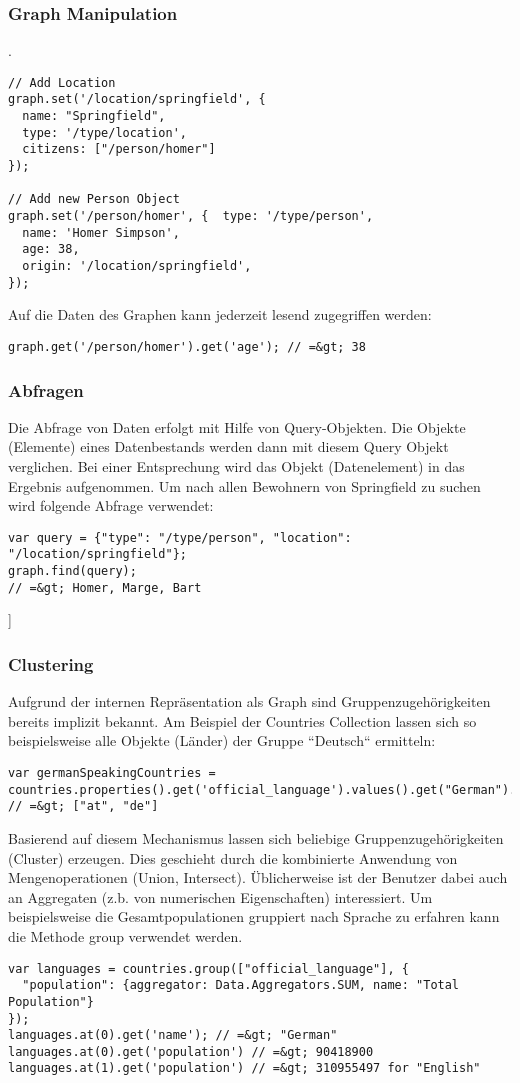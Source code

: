 \documentclass[runningheads]{llncs}
\begin{document}
\subsubsection{Graph Manipulation}
.\begin{verbatim}
// Add Location
graph.set('/location/springfield', {
  name: "Springfield",
  type: '/type/location',
  citizens: ["/person/homer"]
});

// Add new Person Object
graph.set('/person/homer', {  type: '/type/person',
  name: 'Homer Simpson',
  age: 38,
  origin: '/location/springfield',
});
\end{verbatim}


Auf die Daten des Graphen kann jederzeit lesend zugegriffen werden:\begin{verbatim}
graph.get('/person/homer').get('age'); // =&gt; 38
\end{verbatim}


\subsubsection{Abfragen}


Die Abfrage von Daten erfolgt mit Hilfe von Query-Objekten. Die Objekte (Elemente) eines Datenbestands werden dann mit diesem Query Objekt verglichen. Bei einer Entsprechung wird das Objekt (Datenelement) in das Ergebnis aufgenommen. Um nach allen Bewohnern von Springfield zu suchen wird folgende Abfrage verwendet:\begin{verbatim}
var query = {"type": "/type/person", "location": "/location/springfield"};
graph.find(query);
// =&gt; Homer, Marge, Bart
\end{verbatim}
]

\subsubsection{Clustering}


Aufgrund der internen Repräsentation als Graph sind Gruppenzugehörigkeiten bereits implizit bekannt. Am Beispiel der Countries Collection lassen sich so beispielsweise alle Objekte (Länder) der Gruppe ``Deutsch`` ermitteln:\begin{verbatim}
var germanSpeakingCountries = countries.properties().get('official_language').values().get("German").objects();
// =&gt; ["at", "de"]
\end{verbatim}


Basierend auf diesem Mechanismus lassen sich beliebige Gruppenzugehörigkeiten (Cluster) erzeugen. Dies geschieht durch die kombinierte Anwendung von Mengenoperationen (Union, Intersect). Üblicherweise ist der Benutzer dabei auch an Aggregaten (z.b. von numerischen Eigenschaften) interessiert. Um beispielsweise die Gesamtpopulationen gruppiert nach Sprache zu erfahren kann die Methode group verwendet werden.\begin{verbatim}
var languages = countries.group(["official_language"], {
  "population": {aggregator: Data.Aggregators.SUM, name: "Total Population"}
});
languages.at(0).get('name'); // =&gt; "German"
languages.at(0).get('population') // =&gt; 90418900
languages.at(1).get('population') // =&gt; 310955497 for "English"
\end{verbatim}
\end{document}
